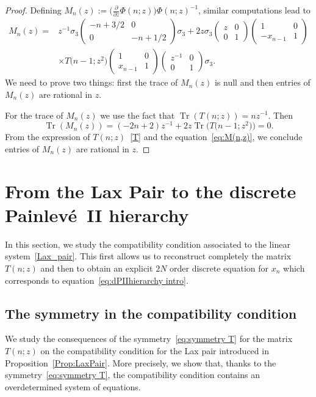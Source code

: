 \documentclass[pdftex]{sigma}%
\numberwithin{equation}{section}
\DeclareMathOperator{\Tr}{Tr}
\begin{document}
\begin{proof}
		Defining $M_n(z):=\big(\frac{\partial}{\partial z}\Phi(n;z)\big)\Phi(n;z)^{-1}$, similar computations lead to
		\begin{align}
			M_n(z)={}&z^{-1}\sigma_3\begin{pmatrix}
				-n+3/2 &0\\
				0 & -n+1/2
			\end{pmatrix}\sigma_3+2z\sigma_3\begin{pmatrix}
				z &0\\
				0 & 1
			\end{pmatrix}\begin{pmatrix}
				1 & 0\\
				-x_{n-1} & 1
			\end{pmatrix}\nonumber
\\[1mm]
&\times T\big(n-1;z^2\big)\begin{pmatrix}
				1 & 0\\
				x_{n-1} & 1
			\end{pmatrix}\begin{pmatrix}
				z^{-1} &0\\
				0 & 1
			\end{pmatrix}\sigma_3.
			\label{eq:M(n,z)}
		\end{align}
		We need to prove two things: first the trace of $M_n(z)$ is null and then entries of $M_n(z)$ are rational in $z$.

		For the trace of $M_n(z)$ we use the fact that $\Tr(T(n;z))=nz^{-1}$. Then
		\begin{equation*}
		\Tr(M_n(z))=(-2n+2)z^{-1}+2z\Tr\big(T\big(n-1;z^2\big)\big)=0.
		\end{equation*}
		From the expression of $T(n;z)$~\eqref{T} and the equation~\eqref{eq:M(n,z)}, we conclude entries of $M_n(z)$ are rational in $z$.
	\end{proof}
	
	\section{From the Lax Pair to the discrete Painlev\'e~II hierarchy}
	\label{sec3}
	In this section, we study the compatibility condition associated to the linear system~\eqref{Lax_pair}. This first allows us to reconstruct completely the matrix $T(n;z)$ and then to obtain an explicit $2N$ order discrete equation for $x_n$ which corresponds to equation~\eqref{eq:dPIIhierarchy intro}.
	\subsection{The symmetry in the compatibility condition}
	We study the consequences of the symmetry~\eqref{eq:symmetry T} for the matrix $T(n;z)$ on the compatibility condition for the Lax pair introduced in Proposition~\ref{Prop:LaxPair}. More precisely, we show that, thanks to the symmetry~\eqref{eq:symmetry T}, the compatibility condition contains an overdetermined system of equations.
\end{document}
